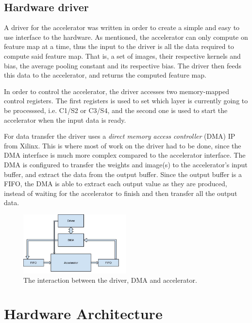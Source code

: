 \subsection{Hardware driver}

A driver for the accelerator was written in order to create a simple and easy to use interface to the hardware. As mentioned, the accelerator can only compute on feature map at a time, thus the input to the driver is all the data required to compute said feature map. That is, a set of images, their respective kernels and bias, the average pooling constant and its respective bias. The driver then feeds this data to the accelerator, and returns the computed feature map. 

In order to control the accelerator, the driver accesses two memory-mapped control registers. The first registers is used to set which layer is currently going to be processsed, i.e. C1/S2 or C3/S4, and the second one is used to start the accelerator when the input data is ready. 

For data transfer the driver uses a \textit{direct memory access controller} (DMA) IP from Xilinx. This is where most of work on the driver had to be done, since the DMA interface is much more complex compared to the accelerator interface. The DMA is configured to transfer the weights and image(s) to the accelerator's input buffer, and extract the data from the output buffer. Since the output buffer is a FIFO, the DMA is able to extract each output value as they are produced, instead of waiting for the accelerator to finish and then transfer all the output data. 


\begin{figure}[h!]
  \centering
      \includegraphics[width=0.5\textwidth]{Figures/Method/DriverAcceleratorInteraction}
    \caption{The interaction between the driver, DMA and accelerator.}
    \label{fig_driver_acc_interact}
\end{figure}
 

\section{Hardware Architecture}

